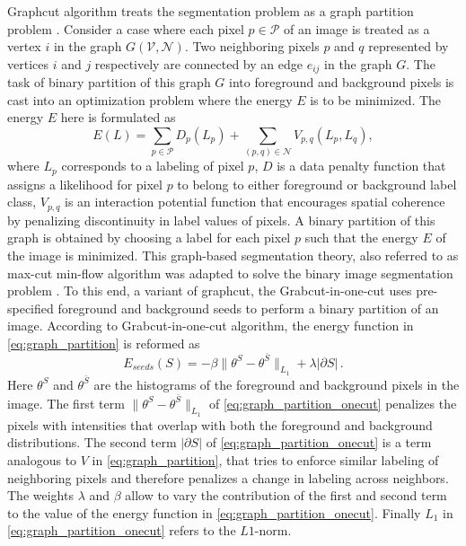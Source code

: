 \documentclass {udthesis}
\begin{document}
Graphcut algorithm treats the segmentation problem as a graph partition problem \cite{mincut_maxflow}. Consider a case where each pixel $p \in \mathcal{P}$ of an image is treated as a vertex $i$ in the graph $G(\mathcal{V},\mathcal{N})$. Two neighboring pixels $p$ and $q$ represented by vertices $i$ and $j$ respectively are connected by an edge $e_{ij}$ in the graph $G$. The task of binary partition of this graph $G$ into foreground and background pixels is cast into an optimization problem where the energy $E$ is to be minimized. The energy $E$ here is formulated as 
%
\begin{equation}	\label{eq:graph_partition}
  E(L)=\sum\limits_{p\in \mathcal{P}} D_p(L_p)+\sum\limits_{(p,q)\in \mathcal{N}} V_{p,q} (L_p,L_q),
\end{equation}
%
where $L_p$ corresponds to a labeling of pixel $p$, $D$ is a data penalty function that assigns a likelihood for pixel $p$ to belong to either foreground or background label class, $V_{p,q}$ is an interaction potential function that encourages spatial coherence by penalizing discontinuity in label values of pixels. A binary partition of this graph is obtained by choosing a label for each pixel $p$ such that the energy $E$ of the image is minimized. This graph-based segmentation theory, also referred to as max-cut min-flow algorithm was adapted to solve the binary image segmentation problem \cite{onecut}. To this end, a variant of graphcut, the Grabcut-in-one-cut \cite{onecut} uses pre-specified foreground and background seeds to perform a binary partition of an image. According to Grabcut-in-one-cut algorithm, the energy function in \eqref{eq:graph_partition} is reformed as
%
\begin{equation} \label{eq:graph_partition_onecut}
  E_{seeds}(S)=-\beta \| \theta^S-\theta^{\bar{S}} \|_{L_1}+\lambda|\partial S|\,.
\end{equation}
%
Here $\theta^S$ and $\theta^{\bar{S}}$ are the histograms of the foreground and background pixels in the image. The first term 
$\| \theta^S-\theta^{\bar{S}} \|_{L_1}$ of \eqref{eq:graph_partition_onecut} penalizes the pixels with intensities that overlap with both the foreground and background distributions. The second term $|\partial S|$ of \eqref{eq:graph_partition_onecut} is a term analogous to $V$ in \eqref{eq:graph_partition}, that tries to enforce similar labeling of neighboring pixels and therefore penalizes a change in labeling across neighbors. The weights $\lambda$ and $\beta$ allow to vary the contribution of the first and second term to the value of the energy function in \eqref{eq:graph_partition_onecut}. Finally $L_1$ in \eqref{eq:graph_partition_onecut} refers to the $L1$-norm.
\end{document}
